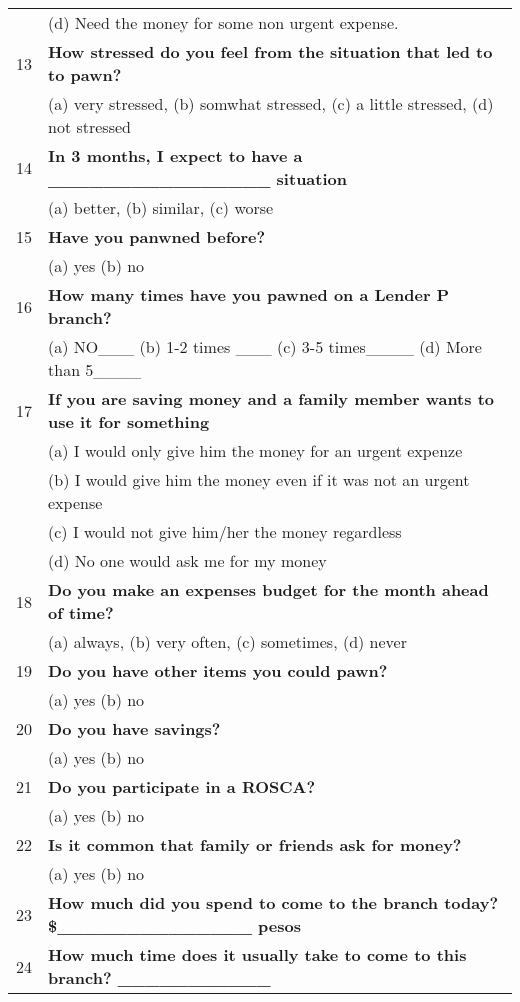 \begin{tabular}{cl}
      & (d) Need the money for some non urgent expense. \\
13    & \textbf{How stressed do you feel from the situation that led to to pawn?} \\
      & (a) very stressed, (b) somwhat stressed, (c) a little stressed, (d) not stressed  \\
14    & \textbf{In 3 months, I expect to have a  \_\_\_\_\_\_\_\_\_\_\_\_\_\_\_\_ situation} \\
      & (a) better, (b) similar,  (c) worse \\
15    & \textbf{Have you panwned before?} \\
      & (a) yes  (b) no \\
16    & \textbf{How many times have you pawned on a Lender P branch?} \\
      & (a) NO\_\_\_    (b)  1-2 times \_\_\_    (c) 3-5 times\_\_\_\_   (d) More than 5\_\_\_\_ \\
17    & \textbf{If you are saving money and a family member wants to use it for something } \\
      & (a) I would only give him the money for an urgent expenze \\
      & (b) I would give him the money even if it was not an urgent expense \\
      & (c) I would not give him/her the money regardless \\
      & (d) No one would ask me for my money \\
18    & \textbf{Do you make an expenses budget for the month ahead of time?} \\
      & (a) always, (b) very often, (c) sometimes, (d) never \\
19    & \textbf{Do you have other items you could pawn?} \\
      & (a) yes  (b) no \\
20    & \textbf{Do you have savings?} \\
      & (a) yes  (b) no \\
21    & \textbf{Do you participate in a ROSCA?} \\
      & (a) yes  (b) no \\
22    & \textbf{Is it common that family or friends ask for money?} \\
      & (a) yes  (b) no \\
23    & \textbf{How much did you spend to come to the branch today?    \$\_\_\_\_\_\_\_\_\_\_\_\_\_\_ pesos} \\
24    & \textbf{How much time does it usually take to come to this branch?    \_\_\_\_\_\_\_\_\_\_\_} \\

\end{tabular}
